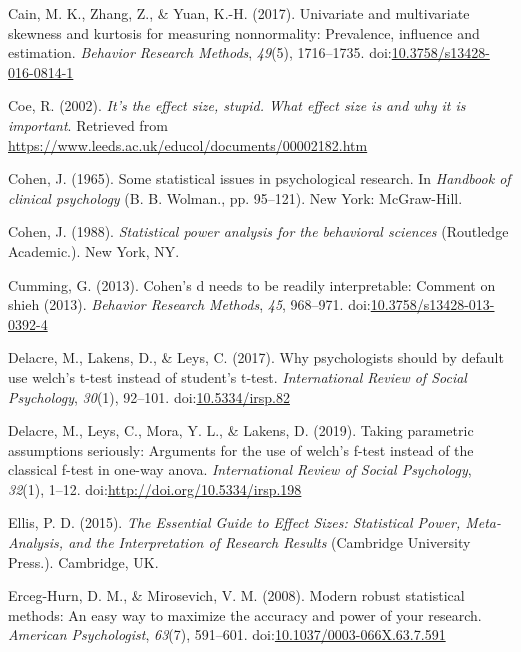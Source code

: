 \documentclass[
  man,floatsintext]{apa6}
\begin{document}
\leavevmode\hypertarget{ref-Cain_et_al_2017}{}%
Cain, M. K., Zhang, Z., \& Yuan, K.-H. (2017). Univariate and multivariate skewness and kurtosis for measuring nonnormality: Prevalence, influence and estimation. \emph{Behavior Research Methods}, \emph{49}(5), 1716--1735. doi:\href{https://doi.org/10.3758/s13428-016-0814-1}{10.3758/s13428-016-0814-1}

\leavevmode\hypertarget{ref-Coe_2002}{}%
Coe, R. (2002). \emph{It's the effect size, stupid. What effect size is and why it is important}. Retrieved from \url{https://www.leeds.ac.uk/educol/documents/00002182.htm}

\leavevmode\hypertarget{ref-Cohen_1965}{}%
Cohen, J. (1965). Some statistical issues in psychological research. In \emph{Handbook of clinical psychology} (B. B. Wolman., pp. 95--121). New York: McGraw-Hill.

\leavevmode\hypertarget{ref-Cohen_1988}{}%
Cohen, J. (1988). \emph{Statistical power analysis for the behavioral sciences} (Routledge Academic.). New York, NY.

\leavevmode\hypertarget{ref-Cumming_2013}{}%
Cumming, G. (2013). Cohen's d needs to be readily interpretable: Comment on shieh (2013). \emph{Behavior Research Methods}, \emph{45}, 968--971. doi:\href{https://doi.org/10.3758/s13428-013-0392-4}{10.3758/s13428-013-0392-4}

\leavevmode\hypertarget{ref-Delacre_et_al_2017}{}%
Delacre, M., Lakens, D., \& Leys, C. (2017). Why psychologists should by default use welch's t-test instead of student's t-test. \emph{International Review of Social Psychology}, \emph{30}(1), 92--101. doi:\href{https://doi.org/10.5334/irsp.82}{10.5334/irsp.82}

\leavevmode\hypertarget{ref-Delacre_et_al_2019}{}%
Delacre, M., Leys, C., Mora, Y. L., \& Lakens, D. (2019). Taking parametric assumptions seriously: Arguments for the use of welch's f-test instead of the classical f-test in one-way anova. \emph{International Review of Social Psychology}, \emph{32}(1), 1--12. doi:\href{https://doi.org/http://doi.org/10.5334/irsp.198}{http://doi.org/10.5334/irsp.198}

\leavevmode\hypertarget{ref-Ellis_2015}{}%
Ellis, P. D. (2015). \emph{The Essential Guide to Effect Sizes: Statistical Power, Meta-Analysis, and the Interpretation of Research Results} (Cambridge University Press.). Cambridge, UK.

\leavevmode\hypertarget{ref-Erceg-Hurn_Mirosevich_2008}{}%
Erceg-Hurn, D. M., \& Mirosevich, V. M. (2008). Modern robust statistical methods: An easy way to maximize the accuracy and power of your research. \emph{American Psychologist}, \emph{63}(7), 591--601. doi:\href{https://doi.org/10.1037/0003-066X.63.7.591}{10.1037/0003-066X.63.7.591}
\end{document}
